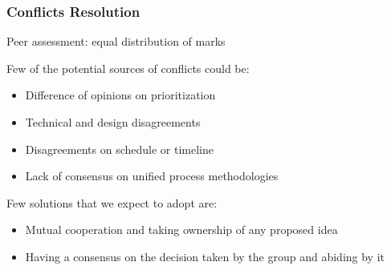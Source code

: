 \documentclass[11pt,compress,xcolor={usenames,dvipsnames}]{beamer}
\begin{document}
\begin{frame}
\frametitle{Conflicts Resolution}
Peer assessment: equal distribution of marks

Few of the potential sources of conflicts could be:
\begin{itemize}
\item Difference of opinions on prioritization
\item Technical and design disagreements
\item Disagreements on schedule or timeline
\item Lack of consensus on unified process methodologies
\end{itemize}
Few solutions that we expect to adopt are:
\begin{itemize}
\item Mutual cooperation and taking ownership of any proposed idea
\item Having a consensus on the decision taken by the group and abiding by it
\end{itemize}
\end{frame}
\end{document}
